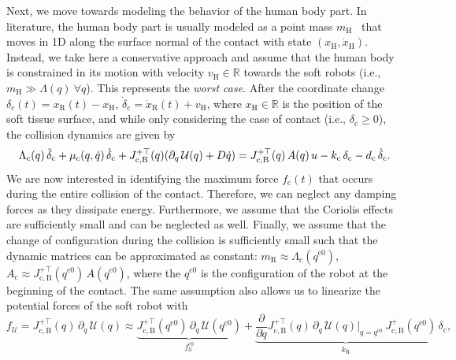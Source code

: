 Next, we move towards modeling the behavior of the human body part. In literature, the human body part is usually modeled as a point mass $m_\mathrm{H}$~\citep{haddadin2011safe, Isots_15066_2016} that moves in 1D along the surface normal of the contact with state $(x_\mathrm{H},\dot{x}_\mathrm{H})$. Instead, we take here a conservative approach and assume that the human body is constrained in its motion with velocity $v_\mathrm{H} \in \mathbb{R}$ towards the soft robots (i.e., $m_\mathrm{H} \gg \Lambda(q) \: \forall q$). This represents the \emph{worst case}.
After the coordinate change $\delta_\mathrm{c}(t) = x_\mathrm{R}(t) - x_\mathrm{H}$, $\dot{\delta}_\mathrm{c} = \dot{x}_\mathrm{R}(t) + v_\mathrm{H}$, %
where $x_\mathrm{H} \in \mathbb{R}$ is the position of the soft tissue surface, and while only considering the case of contact (i.e., $\delta_\mathrm{c} \geq 0$), the collision dynamics are given by
\begin{equation}
    \Lambda_\mathrm{c}(q) \, \Ddot{\delta}_\mathrm{c} + \mu_\mathrm{c}(q,\dot{q}) \, \dot{\delta}_\mathrm{c} + J_\mathrm{c,B}^{+\top}(q) ( \partial_{q} \, \mathcal{U}(q) + D \dot{q} ) = J_\mathrm{c,B}^{+\top}(q) \, A(q) \, u - k_\mathrm{c} \, \delta_\mathrm{c} - d_\mathrm{c} \, \dot{\delta}_\mathrm{c}.
\end{equation}
We are now interested in identifying the maximum force $f_\mathrm{c}(t)$ that occurs during the entire collision of the contact.
Therefore, we can neglect any damping forces as they dissipate energy.
Furthermore, we assume that the Coriolis effects are sufficiently small and can be neglected as well.
Finally, we assume that the change of configuration during the collision is sufficiently small such that the dynamic matrices can be approximated as constant: $m_\mathrm{R} \approx \Lambda_\mathrm{c}(q^{\mathrm{c}0})$, 
$A_\mathrm{c} \approx J_\mathrm{c,B}^{+\top}(q^{\mathrm{c}0}) \, A(q^{\mathrm{c}0})$, where the $q^{\mathrm{c}0}$ is the configuration of the robot at the beginning of the contact.
The same assumption also allows us to linearize the potential forces of the soft robot with 
\begin{equation}
    f_\mathcal{U} = J_\mathrm{c,B}^{+\top}(q) \, \partial_{q} \, \mathcal{U}(q) \approx \underbrace{J_\mathrm{c,B}^{+\top}(q^{\mathrm{c}0}) \, \partial_{q} \, \mathcal{U}(q^{\mathrm{c}0})}_{f_\mathcal{U}^{\mathrm{c0}}} + \underbrace{\frac{\partial}{\partial q} J_\mathrm{c,B}^{+\top}(q) \, \partial_{q} \, \mathcal{U}(q) \Big |_{q=q^{\mathrm{c}0}} \,  J_\mathrm{c,B}^{+}(q^{\mathrm{c}0})}_{k_\mathrm{R}}  \, \delta_\mathrm{c},
\end{equation}

